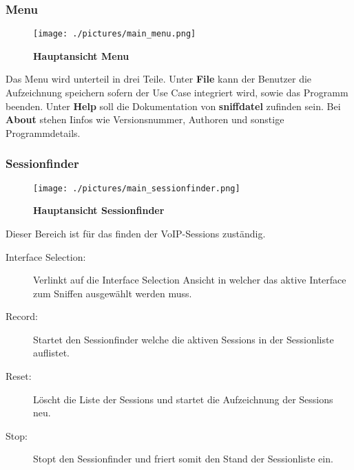 \documentclass[a4,12pt]{scrartcl}
\begin{document}
\subsubsection{Menu}
\begin{figure} [H]
	\begin{center}
	\texttt{[image: ./pictures/main\_menu.png]}
	\caption{\textbf{Hauptansicht Menu}}
	\label{Hauptansicht Menu}
	\end{center}
\end{figure}
Das Menu wird unterteil in drei Teile. Unter \textbf{File} kann der Benutzer die Aufzeichnung speichern sofern der Use Case integriert wird, sowie das Programm beenden. Unter \textbf{Help} soll die Dokumentation von \textbf{sniffdatel} zufinden sein. Bei \textbf{About} stehen Iinfos wie Versionsnummer, Authoren und sonstige Programmdetails.

\subsubsection{Sessionfinder}
\begin{figure} [H]
	\begin{center}
	\texttt{[image: ./pictures/main\_sessionfinder.png]}
	\caption{\textbf{Hauptansicht Sessionfinder}}
	\label{Hauptansicht Sessionfinder}
	\end{center}
\end{figure}

Dieser Bereich ist für das finden der VoIP-Sessions zuständig.
\begin{description}
\item [Interface Selection:]
Verlinkt auf die \grqq{}Interface Selection\grqq{} Ansicht in welcher das aktive Interface zum Sniffen ausgewählt werden muss.
\item [Record:]
Startet den Sessionfinder welche die aktiven Sessions in der Sessionliste auflistet.
\item [Reset:]
Löscht die Liste der Sessions und startet die Aufzeichnung der Sessions neu.
\item [Stop:]
Stopt den Sessionfinder und friert somit den Stand der Sessionliste ein.
\end{description}
\end{document}

